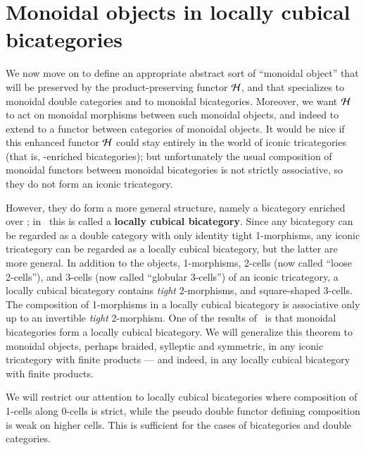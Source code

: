 \section{Monoidal objects in locally cubical bicategories}
\label{sec:mono-objects}

We now move on to define an appropriate abstract sort of ``monoidal object'' that will be preserved by the product-preserving functor $\mathcal{H}$, and that specializes to monoidal double categories and to monoidal bicategories.
Moreover, we want $\mathcal{H}$ to act on monoidal morphisms between such monoidal objects, and indeed to extend to a functor between categories of monoidal objects.
It would be nice if this enhanced functor $\mathcal{H}$ could stay entirely in the world of iconic tricategories (that is, \Icon-enriched bicategories); but unfortunately the usual composition of monoidal functors between monoidal bicategories is not strictly associative, so they do not form an iconic tricategory.

However, they do form a more general structure, namely a bicategory enriched over \cDbl; in~\cite{gg:ldstr-tricat} this is called a \textbf{locally cubical bicategory}.
Since any bicategory can be regarded as a double category with only identity tight 1-morphisms, any iconic tricategory can be regarded as a locally cubical bicategory, but the latter are more general.
In addition to the objects, 1-morphisms, 2-cells (now called ``loose 2-cells''), and 3-cells (now called ``globular 3-cells'') of an iconic tricategory, a locally cubical bicategory contains \emph{tight} 2-morphisms, and square-shaped 3-cells.
The composition of 1-morphisms in a locally cubical bicategory is associative only up to an invertible \emph{tight} 2-morphism. One of the results of~\cite{gg:ldstr-tricat} is that monoidal bicategories form a locally cubical bicategory. 
We will generalize this theorem to monoidal objects, perhaps braided, sylleptic and symmetric, in any iconic tricategory with finite products --- and indeed, in any locally cubical bicategory with finite products.

{We will restrict our attention to locally cubical bicategories where composition of 1-cells along 0-cells is strict, while the pseudo double functor defining composition is weak on higher cells. This is sufficient for the cases of bicategories and double categories.}

